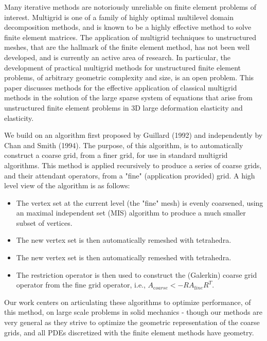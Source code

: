 \documentclass[11pt]{article}
\begin{document}
Many iterative methods are notoriously unreliable on finite element
problems of interest.  Multigrid is one of a family of highly optimal
multilevel domain decomposition methods, and is known to be a highly effective
method to solve finite element matrices.  The application of multigrid
techniques to unstructured meshes, that are the hallmark of the finite
element method, has not been well developed, and is currently an active
area of research.  In particular, the development of practical multigrid
methods for unstructured finite element problems, of arbitrary geometric
complexity and size, is an open problem.   This paper discusses
methods for the effective application of classical multigrid methods in
the solution of the large sparse system of equations that arise from
unstructured
finite element problems in 3D large deformation elasticity and elasticity.

We build on an algorithm first proposed by Guillard (1992) and independently
by Chan and Smith (1994).  The purpose, of this algorithm, is to
automatically
construct a coarse grid, from a finer grid, for use in standard multigrid
algorithms.  This method is applied recursively to produce a series
of coarse grids, and their attendant operators, from a "fine" (application
provided) grid.  A high level view of the algorithm is as follows:
\begin{itemize}
\item
	The vertex set at the current level (the "fine" mesh) is
	evenly coarsened, using an maximal independent set (MIS)
	algorithm to produce a much smaller subset of vertices.
\item
	The new vertex set is then automatically remeshed
	with tetrahedra.
\item
	The new vertex set is then automatically remeshed
	with tetrahedra.
\item
	The restriction operator is then used to construct
	the (Galerkin) coarse grid operator from the fine grid
	operator, i.e., $A_{\mathrm coarse} < -RA_{\mathrm fine} R^T$.
\end{itemize}

Our work centers on articulating these algorithms to optimize performance,
of this method, on large scale problems in solid mechanics - though our
methods are very general as they strive to optimize the geometric
representation of the coarse grids, and all PDEs
discretized with the finite element methods have geometry.
\end{document}
